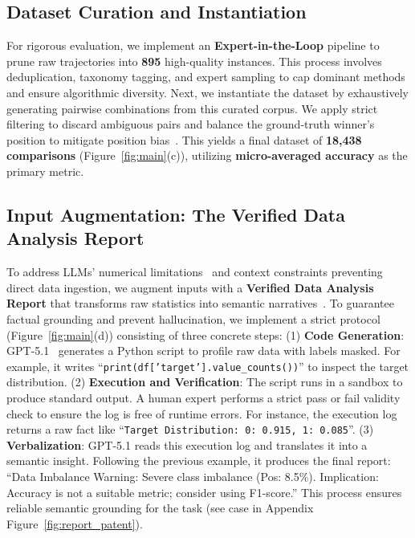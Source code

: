 \subsection{Dataset Curation and Instantiation}
\label{sec:data_construction}

For rigorous evaluation, we implement an \textbf{Expert-in-the-Loop} pipeline to prune raw trajectories into \textbf{895} high-quality instances. 
This process involves deduplication, taxonomy tagging, and expert sampling to cap dominant methods and ensure algorithmic diversity. Next, we instantiate the dataset by exhaustively generating pairwise combinations from this curated corpus. 
We apply strict filtering to discard ambiguous pairs and balance the ground-truth winner's position to mitigate position bias~\cite{Shi2024judingthejudges}. 
This yields a final dataset of \textbf{18,438 comparisons} (Figure~\ref{fig:main}(c)), utilizing \textbf{micro-averaged accuracy} as the primary metric.


\subsection{Input Augmentation: The Verified Data Analysis Report}
\label{sec:input_augmentation}

To address LLMs' numerical limitations~\cite{davies2025languagemodelsembednumbers, li-etal-2025-exposing} and context constraints preventing direct data ingestion, we augment inputs with a \textbf{Verified Data Analysis Report} that transforms raw statistics into semantic narratives~\cite{Rytting2021leveragingtheinductivebias, zhang2025srllmrethinkingstructuredrepresentation}.
To guarantee factual grounding and prevent hallucination, we implement a strict protocol (Figure~\ref{fig:main}(d)) consisting of three concrete steps:
(1) \textbf{Code Generation}: GPT-5.1~\cite{openai2025gpt5card} generates a Python script to profile raw data with labels masked.
For example, it writes ``\texttt{print(df['target'].value\_counts())}'' to inspect the target distribution.
(2) \textbf{Execution and Verification}: The script runs in a sandbox to produce standard output.
A human expert performs a strict pass or fail validity check to ensure the log is free of runtime errors.
For instance, the execution log returns a raw fact like ``\texttt{Target Distribution: 0: 0.915, 1: 0.085}''.
(3) \textbf{Verbalization}: GPT-5.1 reads this execution log and translates it into a semantic insight.
Following the previous example, it produces the final report: ``Data Imbalance Warning: Severe class imbalance (Pos: 8.5\%). Implication: Accuracy is not a suitable metric; consider using F1-score.''
This process ensures reliable semantic grounding for the task (see case in Appendix Figure~\ref{fig:report_patent}).